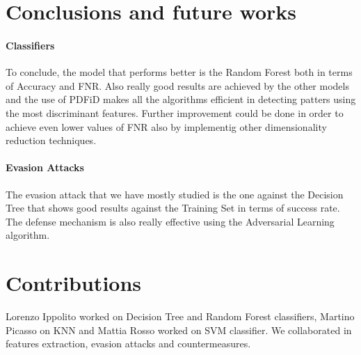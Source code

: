 \documentclass[twocolumn, switch]{article} %
\begin{document}
\section{Conclusions and future works}
\label{sec:conclusions}
\paragraph{Classifiers}
To conclude, the model that performs better is the Random Forest both in terms of Accuracy and FNR. Also really good results are achieved by the other models and the use of PDFiD makes all the algorithms efficient in detecting patters using the most discriminant features. Further improvement could be done in order to achieve even lower values of FNR also by implementig other dimensionality reduction techniques.

\paragraph{Evasion Attacks}
The evasion attack that we have mostly studied is the one against the Decision Tree that shows good results against the Training Set in terms of success rate. The defense mechanism is also really effective using the Adversarial Learning algorithm.

\section{Contributions}
\label{sec:contributions}
Lorenzo Ippolito worked on Decision Tree and Random Forest classifiers, Martino Picasso on KNN and Mattia Rosso worked on SVM classifier. We collaborated in features extraction, evasion attacks and countermeasures.



\normalsize



\end{document}
